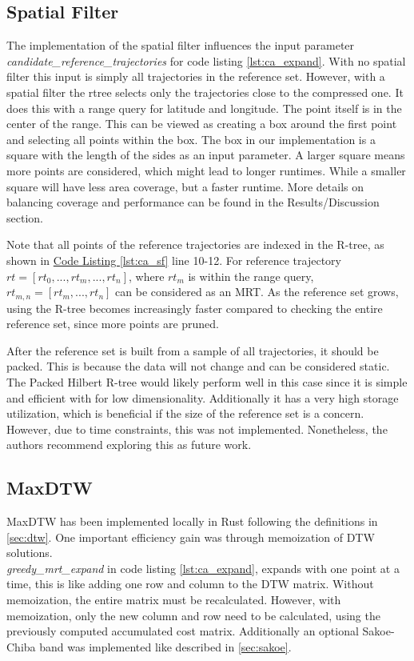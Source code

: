 \subsection{Spatial Filter}
The implementation of the spatial filter influences the input parameter \break \textit{candidate\_reference\_trajectories} for code listing \ref{lst:ca_expand}. With no spatial filter this input is simply all trajectories in the reference set. However, with a spatial filter the rtree selects only the trajectories close to the compressed one. It does this with a range query for latitude and longitude. The point itself is in the center of the range. This can be viewed as creating a box around the first point and selecting all points within the box. The box in our implementation is a square with the length of the sides as an input parameter. A larger square means more points are considered, which might lead to longer runtimes. While a smaller square will have less area coverage, but a faster runtime. More details on balancing coverage and performance can be found in the Results/Discussion section. %

Note that all points of the reference trajectories are indexed in the R-tree, as shown in \hyperref[lst:ca_sf]{Code Listing \ref{lst:ca_sf}} line 10-12. For reference trajectory $rt = [rt_0, ..., rt_m, ..., rt_n]$, where $rt_m$ is within the range query, $rt_{m,n} = [rt_m, ..., rt_n]$ can be considered as an MRT. As the reference set grows, using the R-tree becomes increasingly faster compared to checking the entire reference set, since more points are pruned.

After the reference set is built from a sample of all trajectories, it should be packed. This is because the data will not change and can be considered static. The Packed Hilbert R-tree would likely perform well in this case since it is simple and efficient with for low dimensionality. Additionally it has a very high storage utilization, which is beneficial if the size of the reference set is a concern. However, due to time constraints, this was not implemented. Nonetheless, the authors recommend exploring this as future work.

\subsection{MaxDTW}
MaxDTW has been implemented locally in Rust following the definitions in \ref{sec:dtw}. One important efficiency gain was through memoization of DTW solutions. \\ \textit{greedy\_mrt\_expand} in code listing \ref{lst:ca_expand}, expands with one point at a time, this is like adding one row and column to the DTW matrix. Without memoization, the entire matrix must be recalculated. However, with memoization, only the new column and row need to be calculated, using the previously computed accumulated cost matrix. Additionally an optional Sakoe-Chiba band was implemented like described in \ref{sec:sakoe}.

